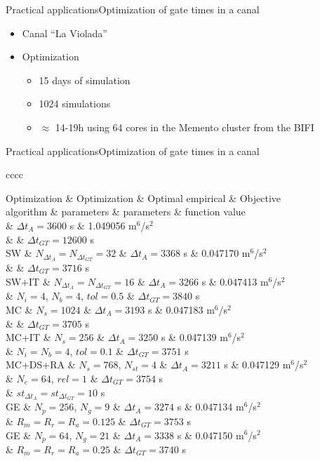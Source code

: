 \documentclass[10pt]{beamer}
\newcommand{\TABLE}[3]
{
	\begin{table}[ht!]
		\centering
		#1
		\tabulinesep=0.9mm
		\begin{tabu}{#2}
			#3
		\end{tabu}
	\end{table}
}
\begin{document}
\begin{frame}{Practical applications}{Optimization of gate times in a canal}
	\begin{itemize}
	  \item Canal ``La Violada''
		\item Optimization
		\begin{itemize}
			\item 15 days of simulation
			\item 1024 simulations
			\item $\approx$ 14-19h using 64 cores in the Memento cluster from the BIFI
		\end{itemize}
	\end{itemize}
\end{frame}

\begin{frame}{Practical applications}{Optimization of gate times in a canal}
\TABLE{\tiny}{cccc}
{
	Optimization & Optimization & Optimal empirical & Objective
	\\ algorithm & parameters & parameters & function value
	\\ \hline
	\multicolumn{2}{c}{Manual management} & $\Delta t_A=3600$ s
	& 1.049056 m$^6$/s$^2$
	\\ & & $\Delta t_{GT}=12600$ s
	\\ \hline
	SW & $N_{\Delta t_A}=N_{\Delta t_{GT}}=32$ & $\Delta t_A=3368$ s
	& 0.047170 m$^6$/s$^2$
	\\ & & $\Delta t_{GT}=3716$ s
	\\ \hline
	SW+IT & $N_{\Delta t_A}=N_{\Delta t_{GT}}=16$ & $\Delta t_A=3266$ s
	& 0.047413 m$^6$/s$^2$
	\\ & $N_i=4$, $N_b=4$, $tol=0.5$ & $\Delta t_{GT}=3840$ s
	\\ \hline
	MC & $N_s=1024$ & $\Delta t_A=3193$ s & 0.047183 m$^6$/s$^2$
	\\ & & $\Delta t_{GT}=3705$ s
	\\ \hline
	MC+IT & $N_s=256$ & $\Delta t_A=3250$ s & 0.047139 m$^6$/s$^2$
	\\ & $N_i=N_b=4$, $tol=0.1$ & $\Delta t_{GT}=3751$ s
	\\ \hline
	MC+DS+RA & $N_s=768$, $N_{st}=4$ & $\Delta t_A=3211$ s
		& 0.047129 m$^6$/s$^2$
	\\ & $N_e=64$, $rel=1$ & $\Delta t_{GT}=3754$ s
	\\ & $st_{\Delta t_A}=st_{\Delta t_{GT}}=10$ s 
	\\ \hline
	GE & $N_p=256$, $N_g=9$ & $\Delta t_A=3274$ s & 0.047134 m$^6$/s$^2$
	\\ & $R_m=R_r=R_a=0.125$ & $\Delta t_{GT}=3753$ s
	\\ \hline
	GE & $N_p=64$, $N_g=21$ & $\Delta t_A=3338$ s & 0.047150 m$^6$/s$^2$
	\\ & $R_m=R_r=R_a=0.25$ & $\Delta t_{GT}=3740$ s
	\\ \hline
}
\end{frame}
\end{document}
